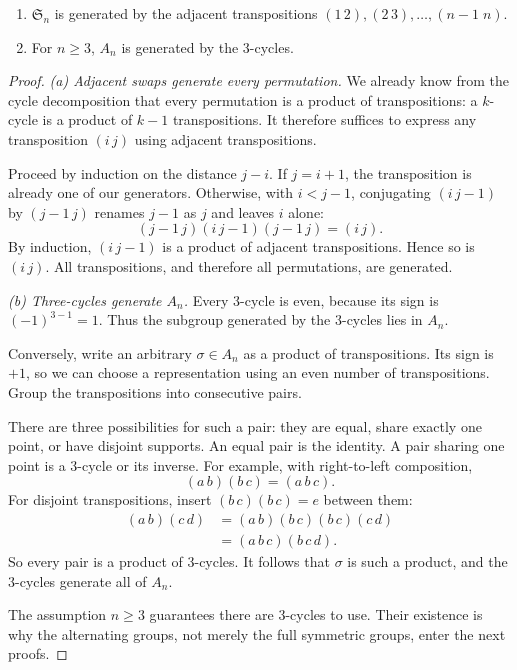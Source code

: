 \begin{proposition}\label{prop:gens}
\begin{enumerate}[label=(\alph*)]
\item $\mathfrak S_n$ is generated by the adjacent transpositions $(1\,2),(2\,3),\dots,(n-1\;n)$.
\item For $n\ge3$, $A_n$ is generated by the $3$-cycles.
\end{enumerate}
\end{proposition}
\begin{proof}
\emph{(a) Adjacent swaps generate every permutation.}
We already know from the cycle decomposition that
every permutation is a product of transpositions:
a $k$-cycle is a product of $k-1$ transpositions.
It therefore suffices to express any transposition
$(i\,j)$ using adjacent transpositions.

Proceed by induction on the distance $j-i$.
If $j=i+1$, the transposition is already one
of our generators. Otherwise, with $i<j-1$,
conjugating $(i\,j-1)$ by $(j-1\,j)$
renames $j-1$ as $j$ and leaves $i$ alone:
\[
(j-1\,j)(i\,j-1)(j-1\,j)=(i\,j).
\]
By induction, $(i\,j-1)$ is a product of
adjacent transpositions. Hence so is $(i\,j)$.
All transpositions, and therefore all
permutations, are generated.

\emph{(b) Three-cycles generate $A_n$.}
Every $3$-cycle is even, because its sign
is $(-1)^{3-1}=1$. Thus the subgroup
generated by the $3$-cycles lies in $A_n$.

Conversely, write an arbitrary $\sigma\in A_n$
as a product of transpositions. Its sign is
$+1$, so we can choose a representation
using an even number of transpositions.
Group the transpositions into consecutive pairs.

There are three possibilities for such a pair:
they are equal, share exactly one point,
or have disjoint supports.
An equal pair is the identity. A pair sharing
one point is a $3$-cycle or its inverse.
For example, with right-to-left composition,
\[
(a\,b)(b\,c)=(a\,b\,c).
\]
For disjoint transpositions, insert
$(b\,c)(b\,c)=e$ between them:
\[
\begin{aligned}
(a\,b)(c\,d)
&=(a\,b)(b\,c)(b\,c)(c\,d)\\
&=(a\,b\,c)(b\,c\,d).
\end{aligned}
\]
So every pair is a product of $3$-cycles.
It follows that $\sigma$ is such a product,
and the $3$-cycles generate all of $A_n$.

The assumption $n\ge3$ guarantees
there are $3$-cycles to use. Their existence
is why the alternating groups, not merely the
full symmetric groups, enter the next proofs.
\end{proof}

